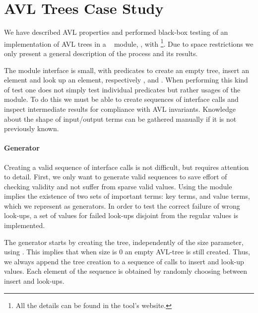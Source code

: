 
\section{AVL Trees Case Study}
\label{sec:case-studies}




We have described AVL properties and performed black-box testing of an
implementation of AVL trees in a \Yap{}~\cite{yap} module, , with
\plqc{}\footnote{All the details can be found in the tool's website.}.
Due to space restrictions we only present a general description of the
process and its results. 


The module interface is small, with predicates to create an empty
tree, insert an element and look up an element, respectively
,  and .
%
When performing this kind of test one does not simply test individual
predicates but rather usages of the module.
%
To do this we must be able to create sequences of interface
calls and inspect intermediate results for compliance with AVL
invariants.
%
Knowledge about the shape of input/output terms can be gathered manually
if it is not previously known.


\paragraph{\bf Generator}

Creating a valid sequence of interface calls is not difficult, but
requires attention to detail.
%
First, we only want to generate valid sequences to save effort of
checking validity and not suffer from sparse valid values.
%
Using the  module implies the existence of two sets of important
terms: key terms, and value terms, which we represent as generators.
%
In order to test the correct failure of wrong look-ups, a set of values
for failed look-ups disjoint from the regular values is implemented.


The generator starts by creating the tree, independently of the
size parameter, using .
%
This implies that when size is 0 an empty AVL-tree is still created.
%
Thus, we always append the tree creation to a sequence of calls to
insert and look-up values.
%
Each element of the sequence is obtained by randomly choosing between
insert and look-ups.



